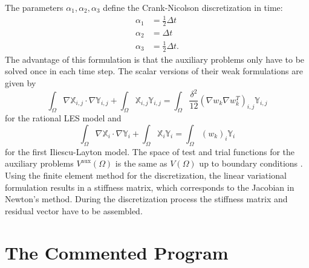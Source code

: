 \documentclass[a4paper, 11pt, twoside]{article}
\begin{document}
The parameters $\alpha_1,\alpha_2,\alpha_3$ define the Crank-Nicolson discretization in time: \begin{equation}
    \begin{aligned}
    \alpha_1 &= \frac{1}{2}\Delta t \\
    \alpha_2 &= \Delta t \\
    \alpha_3 &= \frac{1}{2}\Delta t.
    \end{aligned}
\end{equation}
 The advantage of this formulation is that the auxiliary problems only have to be solved once in each time step. The scalar versions of their weak formulations are given by \begin{equation}
     \int_{\Omega} \nabla \mathbb{X}_{i,j} \cdot \nabla \mathbb{Y}_{i,j} + \int_{\Omega} \mathbb{X}_{i,j}\mathbb{Y}_{i,j} = \int_{\Omega} \frac{\delta^2}{12}(\nabla w_k \nabla w_k^T)_{i,j} \mathbb{Y}_{i,j} 
 \end{equation} for the rational LES model  and \begin{equation}
     \int_{\Omega} \nabla \mathbb{X}_{i} \cdot \nabla \mathbb{Y}_{i} + \int_{\Omega} \mathbb{X}_{i}\mathbb{Y}_{i} = \int_{\Omega} (w_k)_{i} \mathbb{Y}_{i} 
 \end{equation} for the first Iliescu-Layton model. The space of test and trial functions for the auxiliary problems $V^{\text{aux}}(\Omega)$ is the same as $V(\Omega)$ up to boundary conditions \cite{John2004}. Using the finite element method for the discretization, the linear variational formulation 
results in a stiffness matrix, which corresponds to the Jacobian in Newton's method. 
During the discretization process the stiffness matrix and residual vector have to be assembled. 


\section{The Commented Program}
\end{document}
